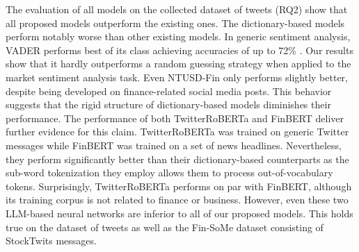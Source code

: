 The evaluation of all models on the collected dataset of tweets (RQ2) show that all proposed models outperform the existing ones. The dictionary-based models perform notably worse than other existing models. In generic sentiment analysis, VADER performs best of its class achieving accuracies of up to 72\% . Our results show that it hardly outperforms a random guessing strategy when applied to the market sentiment analysis task. Even NTUSD-Fin only performs slightly better, despite being developed on finance-related social media posts. This behavior suggests that the rigid structure of dictionary-based models diminishes their performance. The performance of both TwitterRoBERTa and FinBERT deliver further evidence for this claim. TwitterRoBERTa was trained on generic Twitter messages while FinBERT was trained on a set of news headlines. Nevertheless, they perform significantly better than their dictionary-based counterparts as the sub-word tokenization they employ allows them to process out-of-vocabulary tokens. Surprisingly, TwitterRoBERTa performs on par with FinBERT, although its training corpus is not related to finance or business. However, even these two LLM-based neural networks are inferior to all of our proposed models. This holds true on the dataset of tweets as well as the Fin-SoMe dataset consisting of StockTwits messages.


